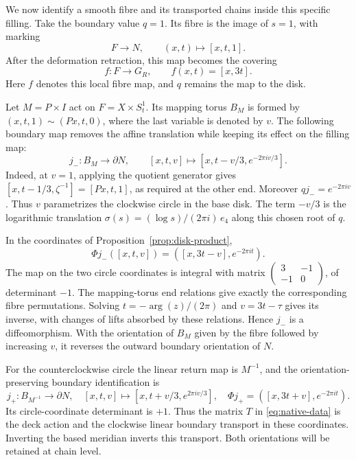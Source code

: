 \documentclass[11pt]{article}
\numberwithin{equation}{section}
\begin{document}
We now identify a smooth fibre and its transported chains inside this
specific filling. Take the boundary value $q=1$. Its fibre is the
image of $s=1$, with marking
\begin{equation}\label{eq:fibre-inclusion}
 F\longrightarrow N,\qquad (x,t)\longmapsto[x,t,1].
\end{equation}
After the deformation retraction, this map becomes the covering
\begin{equation}\label{eq:cover-map}
             f:F\longrightarrow G_R,
             \qquad f(x,t)=[x,3t].
\end{equation}
Here $f$ denotes this local fibre map, and $q$ remains the map to the disk.

Let $M=P\times I$ act on $F=X\times S^1_t$.
Its mapping torus $B_M$ is formed by
$(x,t,1)\sim(Px,t,0)$, where the last variable is denoted by $v$.
The following boundary map removes the affine translation while keeping
its effect on the filling map:
\begin{equation}\label{eq:clockwise-boundary}
 j_-:B_M\longrightarrow\partial N,
 \qquad [x,t,v]\longmapsto
       [x,t-v/3,e^{-2\pi iv/3}].
\end{equation}
Indeed, at $v=1$, applying the quotient generator gives
$[x,t-1/3,\zeta^{-1}]=[Px,t,1]$, as required at the other end.
Moreover $qj_-=e^{-2\pi iv}$. Thus $v$ parametrizes the clockwise
circle in the base disk. The term $-v/3$ is the logarithmic translation
$\sigma(s)=(\log s)/(2\pi i)\,e_4$ along this chosen root of $q$.

In the coordinates of Proposition~\ref{prop:disk-product},
\begin{equation}\label{eq:boundary-product}
       \Phi j_-([x,t,v])=([x,3t-v],e^{-2\pi it}).
\end{equation}
The map on the two circle coordinates is integral with matrix
$\left(\begin{smallmatrix}3&-1\\-1&0\end{smallmatrix}\right)$,
of determinant $-1$. The mapping-torus end relations give exactly the
corresponding fibre permutations. Solving $t=-\arg(z)/(2\pi)$ and
$v=3t-\tau$ gives its inverse, with changes of lifts absorbed by
these relations. Hence $j_-$ is a diffeomorphism. With the orientation
of $B_M$ given by the fibre followed by increasing $v$, it reverses
the outward boundary orientation of $N$.

For the counterclockwise circle the linear return map is $M^{-1}$,
and the orientation-preserving boundary identification is
\begin{equation}\label{eq:counterclockwise-boundary}
 j_+:B_{M^{-1}}\longrightarrow\partial N,
 \quad [x,t,v]\longmapsto[x,t+v/3,e^{2\pi iv/3}],
 \quad \Phi j_+=([x,3t+v],e^{-2\pi it}).
\end{equation}
Its circle-coordinate determinant is $+1$.
Thus the matrix $T$ in \eqref{eq:native-data} is the deck action
and the clockwise linear boundary transport in these coordinates.
Inverting the based meridian inverts this transport. Both orientations
will be retained at chain level.
\end{document}
